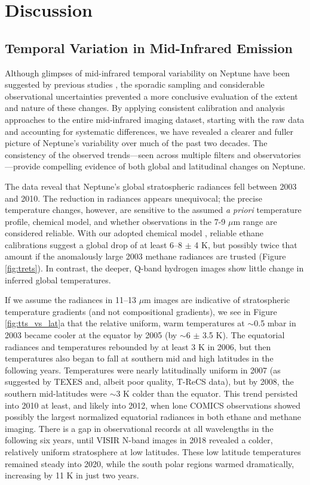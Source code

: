 \documentclass[twocolumn,10pt]{aastex631}
\begin{document}
\section{Discussion}\label{sec:discuss}

\subsection{Temporal Variation in Mid-Infrared Emission}

Although glimpses of mid-infrared temporal variability on Neptune have been suggested by previous studies \citep{hammel2006mid,greathouse2011spatially,fletcher2014neptune}, the sporadic sampling and considerable observational uncertainties prevented a more conclusive evaluation of the extent and nature of these changes. By applying consistent calibration and analysis approaches to the entire mid-infrared imaging dataset, starting with the raw data and accounting for systematic differences, we have revealed a clearer and fuller picture of Neptune's variability over much of the past two decades. The consistency of the observed trends---seen across multiple filters and observatories---provide compelling evidence of both global and latitudinal changes on Neptune. 

The data reveal that Neptune's global stratospheric radiances fell between 2003 and 2010. The reduction in radiances appears unequivocal; the precise temperature changes, however, are sensitive to the assumed \textit{a priori} temperature profile, chemical model, and whether observations in the 7-9 $\mu$m range are considered reliable.  With our adopted chemical model \citep[following][]{moses2018seasonal}, reliable ethane calibrations suggest a global drop of at least 6--8 $\pm$ 4 K, but possibly twice that amount if the anomalously large 2003 methane radiances are trusted (Figure \ref{fig:trets}).  In contrast, the deeper, Q-band hydrogen images show little change in inferred global temperatures. 

If we assume the radiances in 11--13 $\mu$m images are indicative of stratospheric temperature gradients (and not compositional gradients), we see in Figure \ref{fig:tts_vs_lat}a that the relative uniform, warm temperatures at $\sim$0.5 mbar in 2003 became cooler at the equator by 2005 (by $\sim$6 $\pm$ 3.5 K). The equatorial radiances and temperatures rebounded by at least 3 K in 2006, but then temperatures also began to fall at southern mid and high latitudes in the following years. Temperatures were nearly latitudinally uniform in 2007 (as suggested by TEXES and, albeit poor quality, T-ReCS data), but by 2008, the southern mid-latitudes were $\sim$3 K colder than the equator. This trend persisted into 2010 at least, and likely into 2012, when lone COMICS observations showed possibly the largest normalized equatorial radiances in both ethane and methane imaging.  There is a gap in observational records at all wavelengths in the following six years, until VISIR N-band images in 2018 revealed a colder, relatively uniform stratosphere at low latitudes. These low latitude temperatures remained steady into 2020, while the south polar regions warmed dramatically, increasing by 11 K in just two years.
\end{document}
